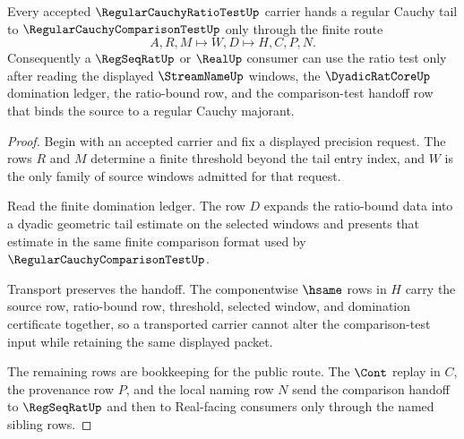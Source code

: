 \begin{theorem}
\label{thm:regular-cauchy-ratio-test-comparison-handoff}
Every accepted $\RegularCauchyRatioTestUp$ carrier hands a regular Cauchy tail to $\RegularCauchyComparisonTestUp$ only through the finite route
$$
A,R,M\longmapsto W,D\longmapsto H,C,P,N.
$$
Consequently a $\RegSeqRatUp$ or $\RealUp$ consumer can use the ratio test only after reading the displayed $\StreamNameUp$ windows, the $\DyadicRatCoreUp$ domination ledger, the ratio-bound row, and the comparison-test handoff row that binds the source to a regular Cauchy majorant.
\end{theorem}
\begin{proof}
Begin with an accepted carrier and fix a displayed precision request. The rows $R$ and $M$ determine a finite threshold beyond the tail entry index, and $W$ is the only family of source windows admitted for that request.

Read the finite domination ledger. The row $D$ expands the ratio-bound data into a dyadic geometric tail estimate on the selected windows and presents that estimate in the same finite comparison format used by $\RegularCauchyComparisonTestUp$.

Transport preserves the handoff. The componentwise $\hsame$ rows in $H$ carry the source row, ratio-bound row, threshold, selected window, and domination certificate together, so a transported carrier cannot alter the comparison-test input while retaining the same displayed packet.

The remaining rows are bookkeeping for the public route. The $\Cont$ replay in $C$, the provenance row $P$, and the local naming row $N$ send the comparison handoff to $\RegSeqRatUp$ and then to Real-facing consumers only through the named sibling rows.
\end{proof}

